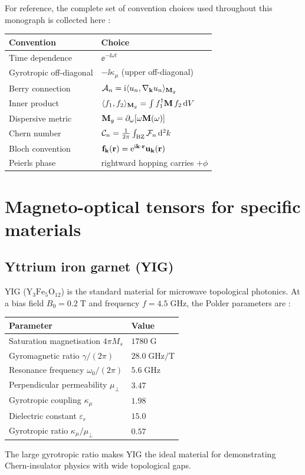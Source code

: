 For reference, the complete set of convention choices used throughout
this monograph is collected here \cite{ozawa2018topological}:
\begin{center}
\begin{tabular}{ll}
  \toprule
  Convention & Choice \\
  \midrule
  Time dependence & $\ee^{-\ii\omega t}$ \\
  Gyrotropic off-diagonal & $-\ii\kappa_\mu$ (upper off-diagonal) \\
  Berry connection & $\mathcal{A}_n=\mathrm{i}\langle u_n , \nabla_{\mathbf{k}} u_n \rangle_{\mathbf{M}_g}$ \\
  Inner product & $\langle f_1 , f_2 \rangle_{\mathbf{M}_g}=\int f_1^\dagger\mathbf{M}\,f_2\,\mathrm{d} V$ \\
  Dispersive metric & $\mathbf{M}_g=\partial_\omega[\omega\mathbf{M}(\omega)]$ \\
  Chern number & $\mathcal{C}_n=\frac{1}{2\pi}\int_{\mathrm{BZ}}
    \mathcal{F}_n\,\mathrm{d}^2 k$ \\
  Bloch convention & $\mathbf{f}_{\mathbf{k}}(\mathbf{r})
    =\mathrm{e}^{\mathrm{i}\mathbf{k}\cdot\mathbf{r}}\mathbf{u}_{\mathbf{k}}(\mathbf{r})$ \\
  Peierls phase & rightward hopping carries $+\phi$ \\
  \bottomrule
\end{tabular}
\end{center}

\section{Magneto-optical tensors for specific materials}
\label{sec:appD-specific-materials}

\subsection{Yttrium iron garnet (YIG)}
\label{sec:appD-yig-parameters}

YIG ($\mathrm{Y_3Fe_5O_{12}}$) is the standard material for microwave
topological photonics.  At a bias field $B_0=0.2\;\mathrm{T}$ and
frequency $f=4.5\;\mathrm{GHz}$, the Polder parameters are
\cite{ozawa2018topological,nature2026observation}:
\begin{center}
\begin{tabular}{ll}
  \toprule
  Parameter & Value \\
  \midrule
  Saturation magnetisation $4\pi M_s$ & $1780\;\mathrm{G}$ \\
  Gyromagnetic ratio $\gamma/(2\pi)$ & $28.0\;\mathrm{GHz/T}$ \\
  Resonance frequency $\omega_0/(2\pi)$ & $5.6\;\mathrm{GHz}$ \\
  Perpendicular permeability $\mu_\perp$ & $3.47$ \\
  Gyrotropic coupling $\kappa_\mu$ & $1.98$ \\
  Dielectric constant $\varepsilon_r$ & $15.0$ \\
  Gyrotropic ratio $\kappa_\mu/\mu_\perp$ & $0.57$ \\
  \bottomrule
\end{tabular}
\end{center}
The large gyrotropic ratio makes YIG the ideal material for
demonstrating Chern-insulator physics with wide topological gaps.

